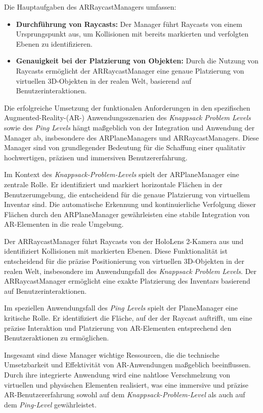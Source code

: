 \begin{itemize}
    Die Hauptaufgaben des ARRaycastManagers umfassen:
    \begin{itemize}
        \item \textbf{Durchführung von Raycasts:} Der Manager führt Raycasts von einem Ursprungspunkt aus, um
        Kollisionen mit bereits markierten und verfolgten Ebenen zu identifizieren.
        \item \textbf{Genauigkeit bei der Platzierung von Objekten:} Durch die Nutzung von Raycasts ermöglicht der
        ARRaycastManager eine genaue Platzierung von virtuellen 3D-Objekten in der realen Welt, basierend auf
        Benutzerinteraktionen.
    \end{itemize}
\end{itemize}
Die erfolgreiche Umsetzung der funktionalen Anforderungen in den spezifischen Augmented-Reality-(AR-) Anwendungsszenarien
des \textit{Knappsack Problem Levels} sowie des \textit{Ping Levels} hängt maßgeblich von der Integration und
Anwendung der Manager ab, insbesondere des ARPlaneManagers und ARRaycastManagers. Diese Manager sind von grundlegender
Bedeutung für die Schaffung einer qualitativ hochwertigen, präzisen und immersiven Benutzererfahrung.

Im Kontext des \textit{Knappsack-Problem-Levels} spielt der ARPlaneManager eine zentrale Rolle. Er identifiziert und
markiert horizontale Flächen in der Benutzerumgebung, die entscheidend für die genaue Platzierung von virtuellem Inventar
sind. Die automatische Erkennung und kontinuierliche Verfolgung dieser Flächen durch den ARPlaneManager gewährleisten
eine stabile Integration von AR-Elementen in die reale Umgebung.

Der ARRaycastManager führt Raycasts von der HoloLens 2-Kamera aus und identifiziert Kollisionen mit markierten Ebenen.
Diese Funktionalität ist entscheidend für die präzise Positionierung von virtuellen 3D-Objekten in der realen Welt,
insbesondere im Anwendungsfall des \textit{Knappsack Problem Levels}. Der ARRaycastManager ermöglicht eine exakte
Platzierung des Inventars basierend auf Benutzerinteraktionen.

Im speziellen Anwendungsfall des \textit{Ping Levels} spielt der PlaneManager eine kritische Rolle. Er identifiziert
die Fläche, auf der der Raycast auftrifft, um eine präzise Interaktion und Platzierung von AR-Elementen entsprechend
den Benutzeraktionen zu ermöglichen.

Insgesamt sind diese Manager wichtige Ressourcen, die die technische Umsetzbarkeit und Effektivität von AR-Anwendungen
maßgeblich beeinflussen. Durch ihre integrierte Anwendung wird eine nahtlose Verschmelzung von virtuellen und physischen
Elementen realisiert, was eine immersive und präzise AR-Benutzererfahrung sowohl auf dem \textit{Knappsack-Problem-Level}
als auch auf dem \textit{Ping-Level} gewährleistet.

